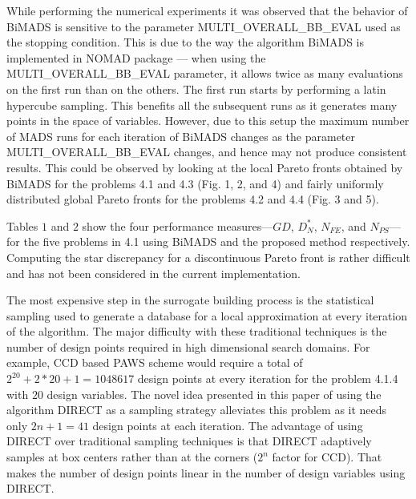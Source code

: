 While performing the numerical experiments it was observed that the behavior of 
BiMADS is sensitive to the parameter MULTI\_OVERALL\_BB\_EVAL used as the 
stopping condition. This is due to the way the algorithm BiMADS is implemented 
in NOMAD package --- when using the MULTI\_OVERALL\_BB\_EVAL parameter, it 
allows twice as many evaluations on the first run than on the others. The first 
run starts by performing a latin hypercube sampling. This benefits all the 
subsequent runs as it generates many points in the space of variables. However, 
due to this setup the maximum number of MADS runs for each iteration of BiMADS 
changes as the parameter MULTI\_OVERALL\_BB\_EVAL changes, and hence may not 
produce consistent results. This could be observed by looking at the local 
Pareto fronts obtained by BiMADS for the problems 4.1 and 4.3 (Fig. 1, 2, and 
4) and fairly uniformly distributed global Pareto fronts for the problems 
4.2 and 4.4 (Fig. 3 and 5). 

Tables $1$ and $2$ show the four performance measures---$GD$, $D_N^*$, 
$N_{FE}$, and $N_{PS}$---for the five problems in 4.1 using BiMADS and the 
proposed method respectively. Computing the star discrepancy for a 
discontinuous Pareto front is rather difficult and has not been considered in 
the current implementation. 

The most expensive step in the surrogate building process is the statistical 
sampling used to generate a database for a local approximation at every 
iteration of the algorithm. The major difficulty with these traditional 
techniques is the number of design points required in high dimensional search 
domains. For example, CCD based PAWS scheme would require a total of 
$2^{20}+2*20+1 = 1048617$ design points at every iteration for the problem 
4.1.4 with $20$ design variables. The novel idea presented in this paper of  
using the algorithm DIRECT as a sampling strategy alleviates this problem as 
it needs only $2n+1=41$ design points at each iteration. The advantage of using 
DIRECT over traditional sampling techniques is that DIRECT adaptively samples 
at box centers rather than at the corners ($2^n$ factor for CCD). That makes 
the number of design points linear in the number of design variables using 
DIRECT. 

